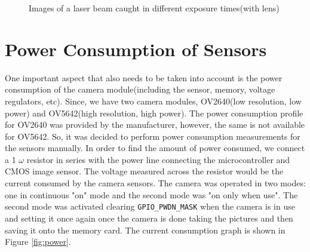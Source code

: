 \begin{figure}[ht]
\begin{subfigure}{0.5\textwidth}
    \end{subfigure}    
    \caption{Images of a laser beam caught in different exposure times(with lens)}
    \label{fig:exptests}
    \end{figure}
    
\section{Power Consumption of Sensors}
 One important aspect that also needs to be taken into account is the power consumption of the camera module(including the sensor, memory, voltage regulators, etc). Since, we have two camera modules, OV2640(low resolution, low power) and OV5642(high resolution, high power). The power consumption profile for OV2640 was provided by the manufacturer, however, the same is not available for OV5642. So, it was decided to perform power consumption measurements for the sensors manually. In order to find the amount of power consumed, we connect a 1 $\omega$ resistor in series with the power line connecting the microcontroller and CMOS image sensor. The voltage measured across the resistor would be the current consumed by the camera sensors. The camera was operated in two modes: one in continuous "on" mode and the second mode was "on only when use". The second mode was activated clearing \texttt{GPIO\_PWDN\_MASK} when the camera is in use and setting it once again once the camera is done taking the pictures and then saving it onto the memory card. The current consumption graph is shown in Figure \ref{fig:power}.
 
